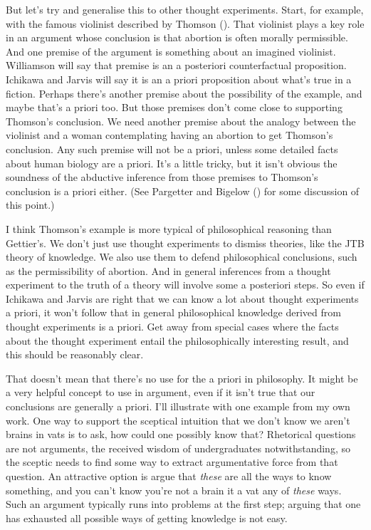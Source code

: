 \documentclass[
  10pt,
  letterpaper,
  DIV=11,
  numbers=noendperiod,
  twoside]{scrartcl}
\begin{document}
But let's try and generalise this to other thought experiments. Start,
for example, with the famous violinist described by Thomson
(). That violinist plays a key role in
an argument whose conclusion is that abortion is often morally
permissible. And one premise of the argument is something about an
imagined violinist. Williamson will say that premise is an a posteriori
counterfactual proposition. Ichikawa and Jarvis will say it is an a
priori proposition about what's true in a fiction. Perhaps there's
another premise about the possibility of the example, and maybe that's a
priori too. But those premises don't come close to supporting Thomson's
conclusion. We need another premise about the analogy between the
violinist and a woman contemplating having an abortion to get Thomson's
conclusion. Any such premise will not be a priori, unless some detailed
facts about human biology are a priori. It's a little tricky, but it
isn't obvious the soundness of the abductive inference from those
premises to Thomson's conclusion is a priori either. (See Pargetter and
Bigelow () for some discussion
of this point.)

I think Thomson's example is more typical of philosophical reasoning
than Gettier's. We don't just use thought experiments to dismiss
theories, like the JTB theory of knowledge. We also use them to defend
philosophical conclusions, such as the permissibility of abortion. And
in general inferences from a thought experiment to the truth of a theory
will involve some a posteriori steps. So even if Ichikawa and Jarvis are
right that we can know a lot about thought experiments a priori, it
won't follow that in general philosophical knowledge derived from
thought experiments is a priori. Get away from special cases where the
facts about the thought experiment entail the philosophically
interesting result, and this should be reasonably clear.

That doesn't mean that there's no use for the a priori in philosophy. It
might be a very helpful concept to use in argument, even if it isn't
true that our conclusions are generally a priori. I'll illustrate with
one example from my own work. One way to support the sceptical intuition
that we don't know we aren't brains in vats is to ask, how could one
possibly know that? Rhetorical questions are not arguments, the received
wisdom of undergraduates notwithstanding, so the sceptic needs to find
some way to extract argumentative force from that question. An
attractive option is argue that \emph{these} are all the ways to know
something, and you can't know you're not a brain it a vat any of
\emph{these} ways. Such an argument typically runs into problems at the
first step; arguing that one has exhausted all possible ways of getting
knowledge is not easy.
\end{document}
